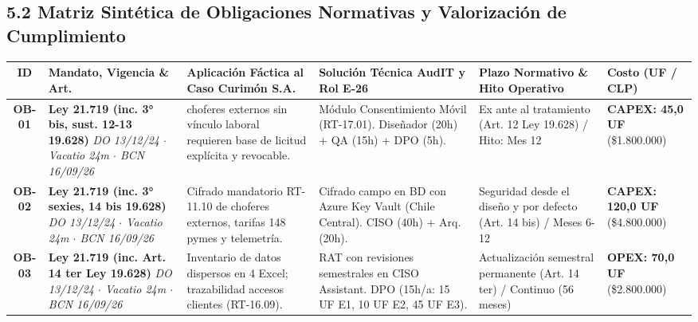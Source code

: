 \documentclass[7.5pt,letterpaper]{article}
\begin{document}
\subsection*{\scriptsize\color{NavyPrimary}5.2 Matriz Sintética de Obligaciones Normativas y Valorización de Cumplimiento}
\vspace{-4.5pt}
\fontsize{5.2pt}{6.1pt}\selectfont
\begin{tabularx}{\textwidth}{@{} c >{\raggedright\arraybackslash}p{2.5cm} >{\raggedright\arraybackslash}p{3.2cm} >{\raggedright\arraybackslash}p{3.5cm} >{\raggedright\arraybackslash}X >{\raggedleft\arraybackslash}p{1.9cm} @{}}
\toprule
\rowcolor{TableHeadBg}
\textbf{ID} & \textbf{Mandato, Vigencia \& Art.} & \textbf{Aplicación Fáctica al Caso Curimón S.A.} & \textbf{Solución Técnica AudIT y Rol E-26} & \textbf{Plazo Normativo \& Hito Operativo} & \textbf{Costo (UF / CLP)} \\
\midrule
\textbf{OB-01} & \textbf{Ley 21.719 (inc. 3° bis, sust. 12-13 19.628)} \newline \textit{DO 13/12/24 $\cdot$ Vacatio 24m $\cdot$ BCN 16/09/26} & 258 choferes externos sin vínculo laboral requieren base de licitud explícita y revocable. & Módulo Consentimiento Móvil (RT-17.01). Diseñador (20h) + QA (15h) + DPO (5h). & Ex ante al tratamiento (Art. 12 Ley 19.628) / Hito: Mes 12 & \textbf{CAPEX: 45,0 UF} \newline (\$1.800.000) \\
\rowcolor{RowAltBg}
\textbf{OB-02} & \textbf{Ley 21.719 (inc. 3° sexies, 14 bis 19.628)} \newline \textit{DO 13/12/24 $\cdot$ Vacatio 24m $\cdot$ BCN 16/09/26} & Cifrado mandatorio RT-11.10 de choferes externos, tarifas 148 pymes y telemetría. & Cifrado campo en BD con Azure Key Vault (Chile Central). CISO (40h) + Arq. (20h). & Seguridad desde el diseño y por defecto (Art. 14 bis) / Meses 6-12 & \textbf{CAPEX: 120,0 UF} \newline (\$4.800.000) \\
\textbf{OB-03} & \textbf{Ley 21.719 (inc. Art. 14 ter Ley 19.628)} \newline \textit{DO 13/12/24 $\cdot$ Vacatio 24m $\cdot$ BCN 16/09/26} & Inventario de datos dispersos en 4 Excel; trazabilidad accesos clientes (RT-16.09). & RAT con revisiones semestrales en CISO Assistant. DPO (15h/a: 15 UF E1, 10 UF E2, 45 UF E3). & Actualización semestral permanente (Art. 14 ter) / Continuo (56 meses) & \textbf{OPEX: 70,0 UF} \newline (\$2.800.000) \\

\end{tabularx}
\end{document}

